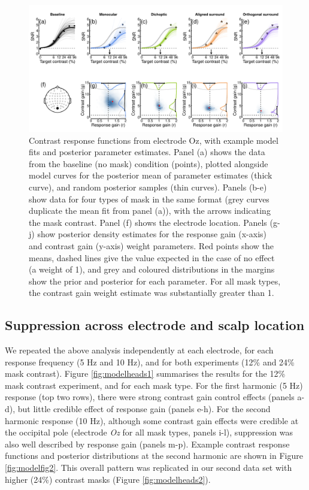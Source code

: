 \documentclass[]{article}
\begin{document}
\begin{figure}

{\centering \includegraphics{figures/modelfig1} 

}

\caption{Contrast response functions from electrode Oz, with example model fits and posterior parameter estimates. Panel (a) shows the data from the baseline (no mask) condition (points), plotted alongside model curves for the posterior mean of parameter estimates (thick curve), and random posterior samples (thin curves). Panels (b-e) show data for four types of mask in the same format (grey curves duplicate the mean fit from panel (a)), with the arrows indicating the mask contrast. Panel (f) shows the electrode location. Panels (g-j) show posterior density estimates for the response gain (x-axis) and contrast gain (y-axis) weight parameters. Red points show the means, dashed lines give the value expected in the case of no effect (a weight of 1), and grey and coloured distributions in the margins show the prior and posterior for each parameter. For all mask types, the contrast gain weight estimate was substantially greater than 1.}\label{fig:modelfig1}
\end{figure}

\hypertarget{suppression-across-electrode-and-scalp-location}{%
\subsection{Suppression across electrode and scalp location}\label{suppression-across-electrode-and-scalp-location}}

We repeated the above analysis independently at each electrode, for each response frequency (5 Hz and 10 Hz), and for both experiments (12\% and 24\% mask contrast). Figure \ref{fig:modelheads1} summarises the results for the 12\% mask contrast experiment, and for each mask type. For the first harmonic (5 Hz) response (top two rows), there were strong contrast gain control effects (panels a-d), but little credible effect of response gain (panels e-h). For the second harmonic response (10 Hz), although some contrast gain effects were credible at the occipital pole (electrode \emph{Oz} for all mask types, panels i-l), suppression was also well described by response gain (panels m-p). Example contrast response functions and posterior distributions at the second harmonic are shown in Figure \ref{fig:modelfig2}. This overall pattern was replicated in our second data set with higher (24\%) contrast masks (Figure \ref{fig:modelheads2}).
\end{document}
